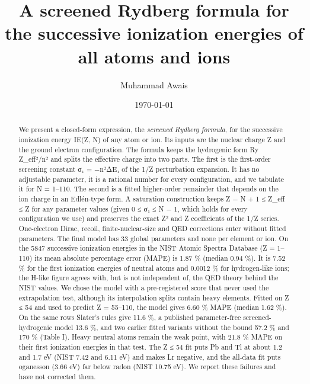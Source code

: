 \documentclass[aps,pra,preprint,superscriptaddress,amsmath,amssymb]{revtex4-2}
\begin{document}
\linenumbers
\title{A screened Rydberg formula for the successive ionization energies of all atoms and ions}
\author{Muhammad Awais}
\date{\today}
\begin{abstract}
We present a closed-form expression, the \emph{screened Rydberg formula}, for the successive ionization energy IE(Z, N) of any atom or ion. Its inputs are the nuclear charge Z and the ground electron configuration. The formula keeps the hydrogenic form Ry Z\_eff²/n² and splits the effective charge into two parts. The first is the first-order screening constant σ₁ = −n²ΔE₁ of the 1/Z perturbation expansion. It has no adjustable parameter, it is a rational number for every configuration, and we tabulate it for N = 1–110. The second is a fitted higher-order remainder that depends on the ion charge in an Edlén-type form. A saturation construction keeps Z − N + 1 ≤ Z\_eff ≤ Z for any parameter values (given 0 ≤ σ₁ ≤ N − 1, which holds for every configuration we use) and preserves the exact Z² and Z coefficients of the 1/Z series. One-electron Dirac, recoil, finite-nuclear-size and QED corrections enter without fitted parameters. The final model has 33 global parameters and none per element or ion. On the 5847 successive ionization energies in the NIST Atomic Spectra Database (Z = 1–110) its mean absolute percentage error (MAPE) is 1.87 \% (median 0.94 \%). It is 7.52 \% for the first ionization energies of neutral atoms and 0.0012 \% for hydrogen-like ions; the H-like figure agrees with, but is not independent of, the QED theory behind the NIST values. We chose the model with a pre-registered score that never used the extrapolation test, although its interpolation splits contain heavy elements. Fitted on Z ≤ 54 and used to predict Z = 55–110, the model gives 6.60 \% MAPE (median 1.62 \%). On the same rows Slater's rules give 11.6 \%, a published parameter-free screened-hydrogenic model 13.6 \%, and two earlier fitted variants without the bound 57.2 \% and 170 \% (Table I). Heavy neutral atoms remain the weak point, with 21.8 \% MAPE on their first ionization energies in that test. The Z ≤ 54 fit puts Pb and Tl at about 1.2 and 1.7 eV (NIST 7.42 and 6.11 eV) and makes Lr negative, and the all-data fit puts oganesson (3.66 eV) far below radon (NIST 10.75 eV). We report these failures and have not corrected them.
\end{abstract}
\maketitle
\end{document}
